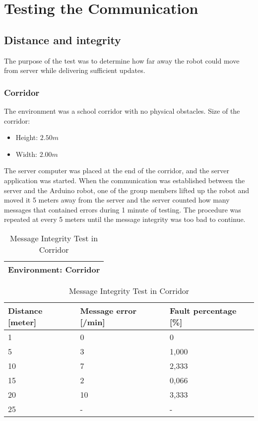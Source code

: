 \newpage
\section{Testing the Communication}
\label{sec:testcom}
\subsection{Distance and integrity}
The purpose of the test was to determine how far away the robot could move from server while delivering sufficient updates.
\subsubsection{Corridor}
The environment was a school corridor with no physical obstacles. Size of the corridor:
\begin{itemize}
    \item Height: $2.50 m$
    \item Width: $2.00 m$
\end{itemize}
The server computer was placed at the end of the corridor, and the server application was started. When the communication was established between the server and the Arduino robot, one of the group members lifted up the robot and moved it 5 meters away from the server and the server counted how many messages that contained errors during 1 minute of testing. The procedure was repeated at every 5 meters until the message integrity was too bad to continue.

\begin{table}[ht]
\begin{center}
 \begin{tabular}{|l|} 
 \hline
 Environment: \textbf{Corridor}\\
 \hline
 \end{tabular}
 \begin{tabular}{|l|l|l|}
 \hline
 Distance [meter] & Message error [/min] &  Fault percentage [\%]\\
 \hline
 1		        &   0 		&	0    \\
 5              &   3  		&	1,000\\
 10             &   7  		&	2,333\\
 15				&	2 		&	0,066\\
 20				&	10 		&	3,333\\
 25				&	-		&	-    \\
 \hline
\end{tabular}
\end{center}
\caption{Message Integrity Test in Corridor}
\label{tab:messintegritycorr}
\end{table}

